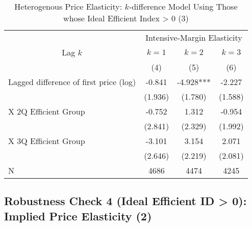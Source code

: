 \documentclass[ review  , 3p ]{elsarticle}
\begin{document}
  \begin{table}
  
  \caption{\label{tab:kableSubsetHeterokDiffElasticitySlide3}Heterogenous Price Elasticity: $k$-difference Model Using Those whose Ideal Efficient Index > 0 (3)}
  \centering
  \fontsize{8}{10}\selectfont
  \begin{tabular}[t]{lccc}
  \toprule
  \multicolumn{1}{c}{ } & \multicolumn{3}{c}{Intensive-Margin Elasticity} \\
  \cmidrule(l{3pt}r{3pt}){2-4}
  \multicolumn{1}{c}{Lag $k$} & \multicolumn{1}{c}{$k = 1$} & \multicolumn{1}{c}{$k = 2$} & \multicolumn{1}{c}{$k = 3$} \\
  \cmidrule(l{3pt}r{3pt}){1-1} \cmidrule(l{3pt}r{3pt}){2-2} \cmidrule(l{3pt}r{3pt}){3-3} \cmidrule(l{3pt}r{3pt}){4-4}
   & (4) & (5) & (6)\\
  \midrule
  Lagged difference of first price (log) & -0.841 & -4.928*** & -2.227\\
   & (1.936) & (1.780) & (1.588)\\
  \hspace{1em}X 2Q Efficient Group & -0.752 & 1.312 & -0.954\\
   & (2.841) & (2.329) & (1.992)\\
  \hspace{1em}X 3Q Efficient Group & -3.101 & 3.154 & 2.071\\
   & (2.646) & (2.219) & (2.081)\\
  N & 4686 & 4474 & 4245\\
  \bottomrule
  \end{tabular}
  \end{table}
  
  \hypertarget{robustness-check-4-ideal-efficient-id-0-implied-price-elasticity-2}{%
  \subsection{Robustness Check 4 (Ideal Efficient ID \textgreater{} 0): Implied Price Elasticity (2)}\label{robustness-check-4-ideal-efficient-id-0-implied-price-elasticity-2}}
  
\end{document}
